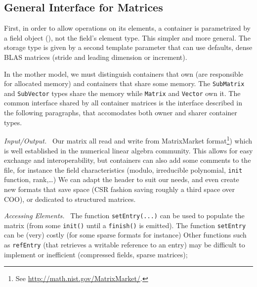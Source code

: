 \subsection{General Interface for %
Matrices}
%
First, in order to allow operations on its elements, a container is
parametrized by a field object (), not the field's element
type. This simpler and more general.  The storage type is given by a second
template parameter that can use defaults,
\eg dense BLAS matrices (stride
and leading dimension or increment).
%

%
In the mother model, we must distinguish containers that own (are responsible
for allocated memory) and containers that share some memory.  The
\texttt{SubMatrix} and \texttt{SubVector} types share the memory while
\texttt{Matrix} and \texttt{Vector} own it.
%
The common interface shared by all container matrices is the \applin  interface
described in the following paragraphs, that accomodates both owner and sharer
container types.
%
% 
%
%
\def\monitem#1{\par\textit{#1}\ }
\monitem{Input/Output.}
		Our matrix all read and write from MatrixMarket
		format\footnote{See \url{http://math.nist.gov/MatrixMarket/}.})
		which is well established in the numerical linear algebra
		community.  This allows for easy exchange and
		interoperability, but \linbox containers can also add some
		comments to the file, for instance the field characteristics
		(modulo, irreducible polynomial, {\tt init} function,
		rank,\ldots) We can adapt the header to suit our needs, and
		even create new formats that save space (CSR fashion saving
		roughly a third space over COO), or dedicated to structured
		matrices.
%
		\monitem{Accessing Elements.}
		The function \texttt{setEntry(...)} can be
		used to populate the matrix (from some \texttt{init()} until a
		\texttt{finish()} is emitted).  The function \texttt{setEntry}
		can be (very) costly (for some sparse formats for instance)
%
		Other functions such as {\tt refEntry} (that retrieves a
		writable reference to an entry) may be difficult to implement
		or inefficient (compressed fields, sparse matrices);

